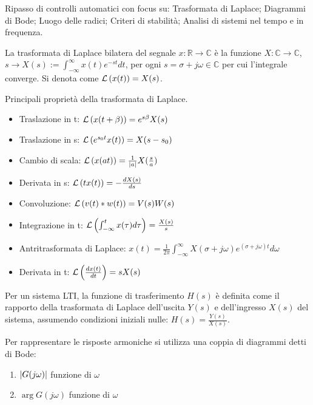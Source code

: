 Ripasso di controlli automatici con focus su: Trasformata di Laplace; Diagrammi di Bode; Luogo delle radici; Criteri di stabilità; Analisi di sistemi nel tempo e in frequenza.

La trasformata di Laplace bilatera del segnale $x:\mathbb{R} \rightarrow \mathbb{C}$ è la funzione $X:\mathbb{C} \rightarrow \mathbb{C}$, $s \rightarrow X(s) := \int^\infty_{-\infty} x(t)e^{-st} dt $, per ogni $s=\sigma + j\omega\in \mathbb{C}$ per cui l'integrale converge. Si denota come $\mathcal{L}\left(x(t)\right) = X(s)$.

Principali proprietà della trasformata di Laplace.
\begin{itemize}
    \item Traslazione in t: $\mathcal{L}\left(x(t+\beta)\right) = e^{s\beta}X(s)$
    \item Traslazione in s: $\mathcal{L}\left(e^{s_0t}x(t)\right) = X(s-s_0)$
    \item Cambio di scala: $\mathcal{L}\left(x(at)\right) = \frac{1}{\left|a\right|}X(\frac{s}{a})$
    \item Derivata in s: $\mathcal{L}\left(tx(t)\right)=-\frac{dX(s)}{ds}$
    \item Convoluzione: $\mathcal{L}\left(v(t)*w(t)\right) = V(s)W(s)$
    \item Integrazione in t: $\mathcal{L}\left(\int^t_{-\infty} x(\tau) d\tau \right)=\frac{X(s)}{s}$
    \item Antritrasformata di Laplace: $x(t)=\frac{1}{2\pi} \int^\infty_{-\infty}X(\sigma+j\omega) e^{(\sigma+j\omega)t} d\omega$
    \item Derivata in t: $\mathcal{L}\left(\frac{dx(t)}{dt}\right) = s X(s)$
\end{itemize}


Per un sistema LTI, la funzione di trasferimento \(H(s)\) è definita come il rapporto della trasformata di Laplace dell'uscita \(Y(s)\) e dell'ingresso \(X(s)\) del sistema, assumendo condizioni iniziali nulle:
\(H(s)=\frac{Y(s)}{X(s)}\).

Per rappresentare le risposte armoniche si utilizza una coppia di diagrammi detti di Bode:
\begin{enumerate}
    \item $\left|G(j\omega)\right|$ funzione di $\omega$
    \item $\arg{G(j\omega)}$ funzione di $\omega$
\end{enumerate}

